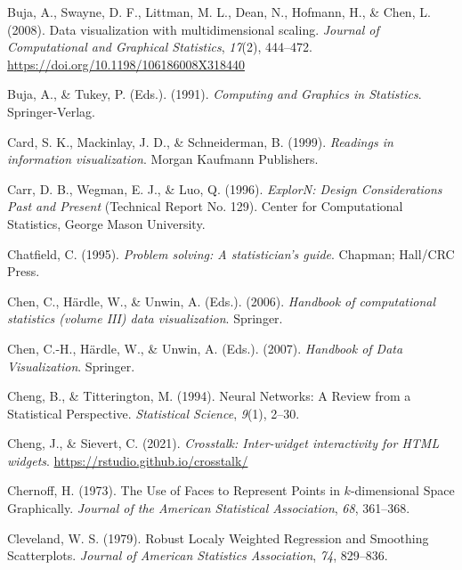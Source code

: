 \documentclass[
  letterpaper,
]{book}
\newlength{\cslhangindent}
\newlength{\cslentryspacingunit} %
\newenvironment{CSLReferences}[2] %
 {%
  \setlength{\parindent}{0pt}
  \ifodd #1
  \let\oldpar\par
  \def\par{\hangindent=\cslhangindent\oldpar}
  \fi
  \setlength{\parskip}{#2\cslentryspacingunit}
 }%
 {}
\begin{document}
\begin{CSLReferences}{1}{0}
\leavevmode{}%
Buja, A., Swayne, D. F., Littman, M. L., Dean, N., Hofmann, H., \& Chen,
L. (2008). Data visualization with multidimensional scaling.
\emph{Journal of Computational and Graphical Statistics}, \emph{17}(2),
444--472. \url{https://doi.org/10.1198/106186008X318440}

\leavevmode{}%
Buja, A., \& Tukey, P. (Eds.). (1991). \emph{Computing and {G}raphics in
{S}tatistics}. Springer-Verlag.

\leavevmode{}%
Card, S. K., Mackinlay, J. D., \& Schneiderman, B. (1999).
\emph{Readings in information visualization}. Morgan Kaufmann
Publishers.

\leavevmode{}%
Carr, D. B., Wegman, E. J., \& Luo, Q. (1996). \emph{Explor{N}: {D}esign
{C}onsiderations {P}ast and {P}resent} (Technical Report No. 129).
Center for Computational Statistics, George Mason University.

\leavevmode{}%
Chatfield, C. (1995). \emph{Problem solving: A statistician's guide}.
Chapman; Hall/CRC Press.

\leavevmode{}%
Chen, C., Härdle, W., \& Unwin, A. (Eds.). (2006). \emph{Handbook of
computational statistics (volume III) data visualization}. Springer.

\leavevmode{}%
Chen, C.-H., Härdle, W., \& Unwin, A. (Eds.). (2007). \emph{Handbook of
{D}ata {V}isualization}. Springer.

\leavevmode{}%
Cheng, B., \& Titterington, M. (1994). Neural {N}etworks: {A} {R}eview
from a {S}tatistical {P}erspective. \emph{Statistical Science},
\emph{9}(1), 2--30.

\leavevmode{}%
Cheng, J., \& Sievert, C. (2021). \emph{Crosstalk: Inter-widget
interactivity for HTML widgets}.
\url{https://rstudio.github.io/crosstalk/}

\leavevmode{}%
Chernoff, H. (1973). The {U}se of {F}aces to {R}epresent {P}oints in
\(k\)-dimensional {S}pace {G}raphically. \emph{Journal of the American
Statistical Association}, \emph{68}, 361--368.

\leavevmode{}%
Cleveland, W. S. (1979). Robust {L}ocaly {W}eighted {R}egression and
{S}moothing {S}catterplots. \emph{Journal of American Statistics
Association}, \emph{74}, 829--836.


\end{CSLReferences}
\end{document}
